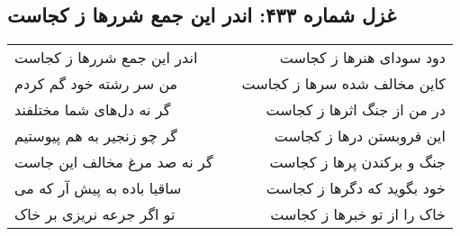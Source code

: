 \begin{center}
\section*{غزل شماره ۴۳۳: اندر این جمع شررها ز کجاست}
\label{sec:0433}
\begin{longtable}{l p{0.5cm} r}
اندر این جمع شررها ز کجاست
&&
دود سودای هنرها ز کجاست
\\
من سر رشته خود گم کردم
&&
کاین مخالف شده سرها ز کجاست
\\
گر نه دل‌های شما مختلفند
&&
در من از جنگ اثرها ز کجاست
\\
گر چو زنجیر به هم پیوستیم
&&
این فروبستن درها ز کجاست
\\
گر نه صد مرغ مخالف این جاست
&&
جنگ و برکندن پرها ز کجاست
\\
ساقیا باده به پیش آر که می
&&
خود بگوید که دگرها ز کجاست
\\
تو اگر جرعه نریزی بر خاک
&&
خاک را از تو خبرها ز کجاست
\\
\end{longtable}
\end{center}
